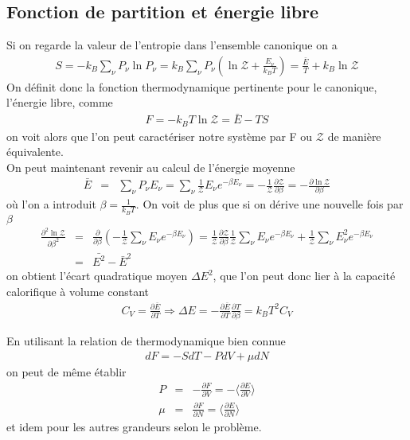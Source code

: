 \documentclass[12pt,prb,aps,epsf]{article}
\begin{document}
\subsection{Fonction de partition et énergie libre}

Si on regarde la valeur de l'entropie dans l'ensemble canonique on a 
\begin{eqnarray}
S = -k_B \sum_{\nu}P_{\nu}\ln P_{\nu} = k_B \sum_{\nu}P_{\nu} \left(\ln\mathcal{Z}+\frac{E_{\nu}}{k_BT}\right) = \frac{\bar{E}}{T} + k_B \ln \mathcal{Z}
\end{eqnarray}
On définit donc la fonction thermodynamique pertinente pour le canonique, l'énergie libre, comme 
\begin{eqnarray}
F = -k_B T \ln \mathcal{Z} = \bar{E} - TS
\end{eqnarray}
on voit alors que l'on peut caractériser notre système par F ou $\mathcal{Z}$ de manière équivalente.\\

On peut maintenant revenir au calcul de l'énergie moyenne 
\begin{eqnarray}
\bar{E} &=& \sum_{\nu} P_{\nu}E_{\nu} = \sum_{\nu}\frac{1}{\mathcal{Z}} E_{\nu} e^{-\beta E_{\nu}} = -\frac{1}{\mathcal{Z}}\frac{\partial \mathcal{Z}}{\partial \beta} = -\frac{\partial \ln \mathcal{Z}}{\partial \beta}
\end{eqnarray}
où l'on a introduit $\beta =\frac{1}{k_BT}$. On voit de plus que si on dérive une nouvelle fois par $\beta$ 
\begin{eqnarray}
\frac{\partial^2 \ln \mathcal{Z}}{\partial \beta^2} &=& \frac{\partial}{\partial \beta}\left(-\frac{1}{\mathcal{Z}}\sum_{\nu}E_{\nu}e^{-\beta E_{\nu}}\right) = \frac{1}{\mathcal{Z}} \frac{\partial \mathcal{Z}}{\partial \beta}\frac{1}{\mathcal{Z}}\sum_{\nu}E_{\nu}e^{-\beta E_{\nu}} + \frac{1}{\mathcal{Z}} \sum_{\nu}E_{\nu}^2e^{-\beta E_{\nu}}\\
&=& \bar{E^2} - \bar{E}^2
\end{eqnarray}
on obtient l'écart quadratique moyen $\Delta E^2$, que l'on peut donc lier à la capacité calorifique à volume constant 
\begin{eqnarray}
 C_V = \frac{\partial \bar{E}}{\partial T} \Longrightarrow \Delta E = - \frac{\partial \bar{E}}{\partial T}\frac{\partial T}{\partial \beta} = k_BT^2 C_V
\end{eqnarray}

En utilisant la relation de thermodynamique bien connue 
\begin{eqnarray}
dF = -SdT - PdV + \mu dN
\end{eqnarray}
on peut de même établir 
\begin{eqnarray}
P &=& -\frac{\partial F}{\partial V} = -\langle\frac{\partial E}{\partial V}\rangle\\
\mu &=& \frac{\partial F}{\partial N} = \langle\frac{\partial E}{\partial N}\rangle
\end{eqnarray}
et idem pour les autres grandeurs selon le problème.
\end{document}
